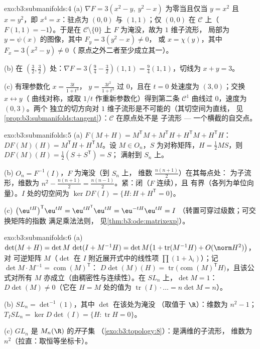 \begin{solution}{exo:b3:submanifolds:4}
(a) $\nabla F = 3(x^2 - y,\ y^2 - x)$ 为零当且仅当 $y = x^2$
且 $x = y^2$，即 $x^4 = x$：驻点为 $(0,0)$ 与 $(1,1)$；仅
$(0,0)$ 在 $\mathcal C$ 上（$F(1,1) = -1$）。于是在 $\mathcal
C\setminus\{0\}$ 上 $F$ 为淹没，故为 $1$ 维子流形，
局部为 $y = \psi(x)$ 的图像，其中 $F_y = 3(y^2 - x) \neq 0$，
或 $x = \chi(y)$，其中 $F_x = 3(x^2 - y) \neq 0$（
原点之外二者至少成立其一）。

(b) 在 $(\frac32, \frac32)$ 处：$\nabla F = 3(\frac94 - \frac32)
(1, 1) = \frac94(1,1)$，切线为 $x + y = 3$。

(c) 有理参数化 $x = \frac{3t}{1 + t^3}$，
$y = \frac{3t^2}{1+t^3}$ 过 $0$，且在 $t = 0$ 处速度为
$(3, 0)$；交换 $x \leftrightarrow y$（
曲线对称，或取 $1/t$ 作重新参数化）得到第二条
$\mathcal C^1$ 曲线过 $0$，速度为 $(0, 3)$。两个
独立的切方向对
$1$ 维子流形是不可能的（其切空间为直线，
见\cref{prop:b3:submanifolds:tangent}）：$\mathcal C$ 在原点处不是
子流形 --- 一个横截的自交点。
\end{solution}

\begin{solution}{exo:b3:submanifolds:5}
(a) $F(M + H) = M^{\mathsf T}M + M^{\mathsf T}H + H^{\mathsf
T}M + H^{\mathsf T}H$：$DF(M)(H) = M^{\mathsf T}H +
H^{\mathsf T}M$。设 $M \in O_n$，$S$ 为对称矩阵，$H =
\frac12MS$，则 $DF(M)(H) = \frac12(S + S^{\mathsf T}) = S$；
满射到 $S_n$ 上。

(b) $O_n = F^{-1}(I)$，$F$ 为淹没（到 $S_n$ 上，
维数 $\frac{n(n+1)}2$）在其每点处：
为子流形，维数为 $n^2 - \frac{n(n+1)}2 =
\frac{n(n-1)}2$。紧：闭（$F$ 连续），且
有界（各列为单位向量）。$I$ 处的切空间为 $\ker DF(I) =
\{H : H + H^{\mathsf T} = 0\}$。

(c) $\bigl(\eu^{tH}\bigr)^{\mathsf T}\eu^{tH} =
\eu^{tH^{\mathsf T}}\eu^{tH} = \eu^{-tH}\eu^{tH} = I$
（转置可穿过级数；可交换矩阵的指数
满足乘法法则，
见\cref{thm:b3:ode:matrixexp}）。
\end{solution}

\begin{solution}{exo:b3:submanifolds:6}
(a) $\det(M + H) = \det M\,\det(I + M^{-1}H) = \det M\bigl(1
+ \operatorname{tr}(M^{-1}H) + O(\norm H^2)\bigr)$，对
可逆矩阵 $M$（$\det$ 在 $I$ 附近展开式中的线性项
$\prod(1 + \lambda_i)$）；记 $\det M\cdot M^{-1} =
\operatorname{com}(M)^{\mathsf T}$：
$D\det(M)(H) = \operatorname{tr}\bigl(\operatorname{com}
(M)^{\mathsf T}H\bigr)$，且该公式对所有 $M$
亦成立（由稠密性与连续性）。在 $SL_n$ 上，$\det M = 1$：
$D\det(M) \ne 0$（它在 $H = M$ 处的值为
$\operatorname{tr}(I)\cdot\dots = n\det M = n$）。

(b) $SL_n = \det^{-1}(1)$，其中 $\det$ 在该处为淹没
（取值于 $\R$）：维数为 $n^2 - 1$；$T_ISL_n = \ker
D\det(I) = \{H : \operatorname{tr}H = 0\}$。

(c) $GL_n$ 是 $M_n(\R)$ 的\emph{开}子集
（\cref{exo:b3:topology:8}）：是满维的子流形，
维数为 $n^2$（拉直：取恒等坐标卡）。
\end{solution}

